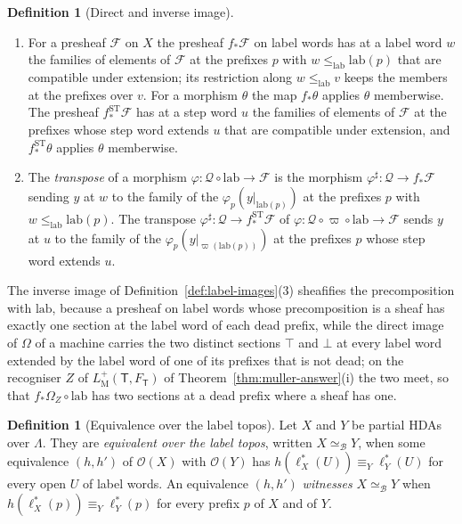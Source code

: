 \documentclass{lmcs}
\theoremstyle{definition}
\newtheorem{definition}[theorem]{Definition}
\theoremstyle{remark}
\newcommand{\Op}{\mathcal{O}}
\newcommand{\feq}[1]{\equiv_{#1}}
\newcommand{\lab}{\mathrm{lab}}
\newcommand{\lle}{\leq_{\mathrm{lab}}}
\providecommand{\LMp}[1]{L^{+}_{\mathrm{M}}(#1)}
\providecommand{\lab}{\mathrm{lab}}
\providecommand{\fgt}{\varpi}
\providecommand{\eqB}{\simeq_{\mathcal{B}}}
\providecommand{\lst}[1]{\ell^{*}_{#1}}
\providecommand{\fsh}{f_{\ast}}
\providecommand{\FT}{F_{\mathsf{T}}}
\providecommand{\fshS}{f^{\mathrm{ST}}_{\ast}}
\begin{document}
\begin{definition}[Direct and inverse image]
\begin{enumerate}
  each presheaf on $X$ a direct image and to each morphism of presheaves a morphism of their direct images so that the
  bijections are natural in $\mathscr{F}$ too. With presheaves on step words and
  $\mathscr{Q}\circ\fgt\circ\lab$ in place of $\mathscr{Q}\circ\lab$ the same two sentences define a direct image of
  $\mathscr{F}$ over step words and a direct image along
  $\fgt\circ\lab$.
\item For a presheaf $\mathscr{F}$ on $X$ the presheaf $\fsh\mathscr{F}$ on label words has at a label word $w$ the
  families of elements of $\mathscr{F}$ at the prefixes $p$ with $w\lle\lab(p)$ that are compatible under extension;
  its restriction along $w\lle v$ keeps the members at the prefixes over $v$. For a morphism $\theta$
  the map $\fsh\theta$ applies $\theta$ memberwise. The presheaf
  $\fshS\mathscr{F}$ has at a step word $u$ the families of elements of $\mathscr{F}$ at the prefixes whose step word
  extends $u$ that are compatible under extension, and $\fshS\theta$ applies $\theta$
  memberwise.
\item The \emph{transpose} of a morphism $\varphi\colon\mathscr{Q}\circ\lab\to\mathscr{F}$ is the morphism
  $\varphi^\sharp\colon\mathscr{Q}\to\fsh\mathscr{F}$ sending $y$ at $w$ to the family of the
  $\varphi_p(y|_{\lab(p)})$ at the prefixes $p$ with $w\lle\lab(p)$. The transpose
  $\varphi^\sharp\colon\mathscr{Q}\to\fshS\mathscr{F}$ of $\varphi\colon\mathscr{Q}\circ\fgt\circ\lab\to\mathscr{F}$
  sends $y$ at $u$ to the family of the $\varphi_p(y|_{\fgt(\lab(p))})$ at the prefixes $p$ whose step word extends
  $u$.
\end{enumerate}
\end{definition}

The inverse image of Definition~\ref{def:label-images}(3) sheafifies the precomposition with $\lab$, because a
presheaf on label words whose precomposition is a sheaf has exactly one section at the label word of each dead
prefix, while the direct image of $\Omega$ of a machine carries the two distinct
sections $\top$ and $\bot$ at every label word extended by the label word of one of its prefixes that
is not dead; on the recogniser $Z$ of $\LMp{\mathsf{T},\FT}$ of
Theorem~\ref{thm:muller-answer}(i) the two meet, so that $\fsh\Omega_Z\circ\lab$ has two sections at a dead prefix where
a sheaf has one.

\begin{definition}[Equivalence over the label topos]\label{def:labels-frame}
Let $X$ and $Y$ be partial HDAs over $\Lambda$. They are \emph{equivalent over the label topos}, written $X\eqB Y$, when some
equivalence $(h,h')$ of $\Op(X)$ with $\Op(Y)$ has $h(\lst{X}(U))\feq{Y}\lst{Y}(U)$ for every open $U$ of label
words. An equivalence $(h,h')$ \emph{witnesses} $X\eqB Y$ when
$h(\lst{X}(p))\feq{Y}\lst{Y}(p)$ for every prefix $p$ of $X$ and of $Y$.
\end{definition}
\end{document}
